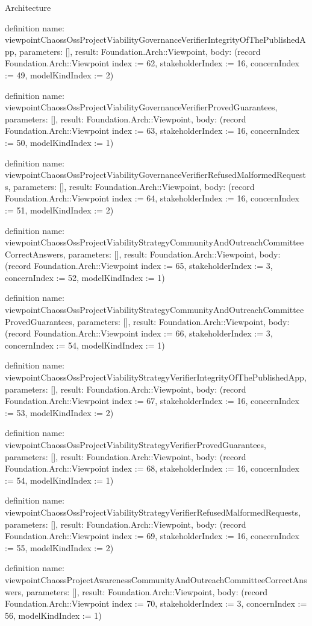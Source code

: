 \begin{lexlean}{Architecture}
\begin{semanticmodule}
definition{
  name: viewpointChaossOssProjectViabilityGovernanceVerifierIntegrityOfThePublishedApp,
  parameters: [],
  result: Foundation.Arch::Viewpoint,
  body: (record Foundation.Arch::Viewpoint {index := 62, stakeholderIndex := 16, concernIndex := 49, modelKindIndex := 2})
}

definition{
  name: viewpointChaossOssProjectViabilityGovernanceVerifierProvedGuarantees,
  parameters: [],
  result: Foundation.Arch::Viewpoint,
  body: (record Foundation.Arch::Viewpoint {index := 63, stakeholderIndex := 16, concernIndex := 50, modelKindIndex := 1})
}

definition{
  name: viewpointChaossOssProjectViabilityGovernanceVerifierRefusedMalformedRequests,
  parameters: [],
  result: Foundation.Arch::Viewpoint,
  body: (record Foundation.Arch::Viewpoint {index := 64, stakeholderIndex := 16, concernIndex := 51, modelKindIndex := 2})
}

definition{
  name: viewpointChaossOssProjectViabilityStrategyCommunityAndOutreachCommitteeCorrectAnswers,
  parameters: [],
  result: Foundation.Arch::Viewpoint,
  body: (record Foundation.Arch::Viewpoint {index := 65, stakeholderIndex := 3, concernIndex := 52, modelKindIndex := 1})
}

definition{
  name: viewpointChaossOssProjectViabilityStrategyCommunityAndOutreachCommitteeProvedGuarantees,
  parameters: [],
  result: Foundation.Arch::Viewpoint,
  body: (record Foundation.Arch::Viewpoint {index := 66, stakeholderIndex := 3, concernIndex := 54, modelKindIndex := 1})
}

definition{
  name: viewpointChaossOssProjectViabilityStrategyVerifierIntegrityOfThePublishedApp,
  parameters: [],
  result: Foundation.Arch::Viewpoint,
  body: (record Foundation.Arch::Viewpoint {index := 67, stakeholderIndex := 16, concernIndex := 53, modelKindIndex := 2})
}

definition{
  name: viewpointChaossOssProjectViabilityStrategyVerifierProvedGuarantees,
  parameters: [],
  result: Foundation.Arch::Viewpoint,
  body: (record Foundation.Arch::Viewpoint {index := 68, stakeholderIndex := 16, concernIndex := 54, modelKindIndex := 1})
}

definition{
  name: viewpointChaossOssProjectViabilityStrategyVerifierRefusedMalformedRequests,
  parameters: [],
  result: Foundation.Arch::Viewpoint,
  body: (record Foundation.Arch::Viewpoint {index := 69, stakeholderIndex := 16, concernIndex := 55, modelKindIndex := 2})
}

definition{
  name: viewpointChaossProjectAwarenessCommunityAndOutreachCommitteeCorrectAnswers,
  parameters: [],
  result: Foundation.Arch::Viewpoint,
  body: (record Foundation.Arch::Viewpoint {index := 70, stakeholderIndex := 3, concernIndex := 56, modelKindIndex := 1})
}


\end{semanticmodule}
\end{lexlean}
